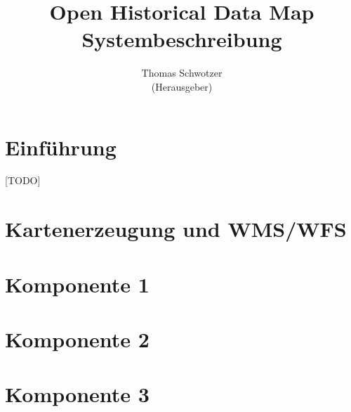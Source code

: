 \documentclass[german]{book}
\begin{document}
\title{Open Historical Data Map\\
Systembeschreibung
}

\author{Thomas Schwotzer \\(Herausgeber)}

\maketitle

\tableofcontents

\chapter{Einführung}
[TODO]

\chapter{Kartenerzeugung und WMS/WFS}


\chapter{Komponente 1}
%

\chapter{Komponente 2}
%

\chapter{Komponente 3}
%
\end{document}
